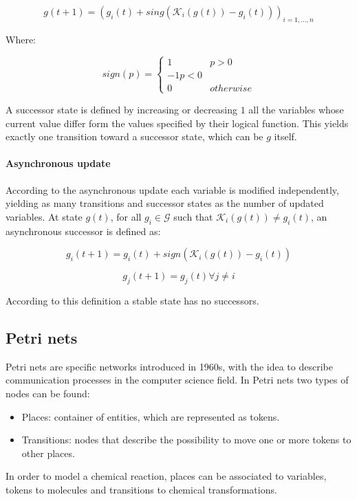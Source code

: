     $$g(t+1) = (g_i(t) + sing(\mathcal{K}_i(g(t))-g_i(t)))_{i=1, \dots, n}$$

    Where:


    $$sign(p) = \begin{cases} 1 & p>0\\ -1 p<0\\ 0 & otherwise\end{cases}$$

    A successor state is defined by increasing or decreasing $1$ all the variables whose current value differ form the values specified by their logical function.
    This yields exactly one transition toward a successor state, which can be $g$ itself.

    \paragraph{Asynchronous update}
    According to the asynchronous update each variable is modified independently, yielding as many transitions and successor states as the number of updated variables.
    At state $g(t)$, for all $g_i\in\mathcal{G}$ such that $\mathcal{K}_i(g(t))\neq g_i(t)$, an asynchronous successor is defined as:

    $$g_i(t+1) = g_i(t) + sign(\mathcal{K}_i(g(t))-g_i(t))$$

    $$g_j(t+1) = g_j(t)\forall j\neq i$$

    According to this definition a stable state has no successors.

  \subsection{Petri nets}
  Petri nets are specific networks introduced in 1960s, with the idea to describe communication processes in the computer science field.
  In Petri nets two types of nodes can be found:

  \begin{multicols}{2}
  \begin{itemize}
    \item Places: container of entities, which are represented as tokens.
    \item Transitions: nodes that describe the possibility to move one or more tokens to other places.
  \end{itemize}
\end{multicols}

  In order to model a chemical reaction, places can be associated to variables, tokens to molecules and transitions to chemical transformations.
  \\

